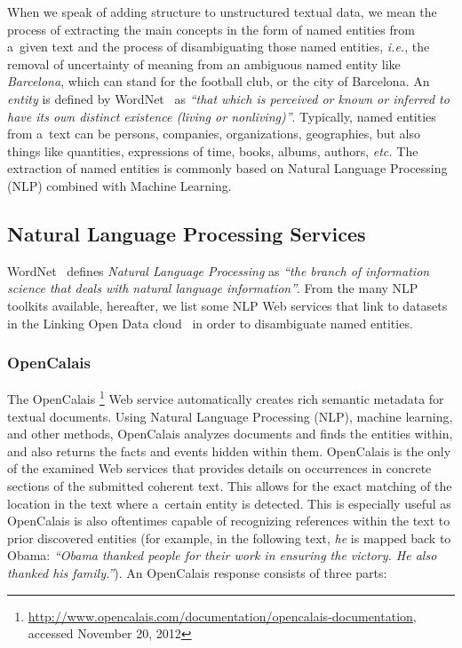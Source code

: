 When we speak of adding structure to unstructured textual data,
we mean the process of extracting the main concepts
in the form of named entities from a~given text
and the process of disambiguating those named entities,
\emph{i.e.}, the removal of uncertainty of meaning from
an ambiguous named entity like \emph{Barcelona},
which can stand for the football club, or the city of Barcelona.
An \emph{entity} is defined by
WordNet~\cite{miller1995wordnet,fellbaum1998wordnet}
as \textit{``that which is perceived or known or inferred
to have its own distinct existence (living or nonliving)''}. 
Typically, named entities from a~text can be persons, companies,
organizations, geographies, but also things like quantities,
expressions of time, books, albums, authors, \emph{etc.}
The extraction of named entities is commonly based on
Natural Language Processing (NLP) combined with Machine Learning.

\subsection{Natural Language Processing Services}
\label{sec:nlp-services}

WordNet~\cite{miller1995wordnet,fellbaum1998wordnet}
defines \emph{Natural Language Processing} as
\textit{``the branch of information science that deals with
natural language information''}.
From the many NLP toolkits available,
hereafter, we list some NLP Web services
that link to datasets in the
Linking Open Data
cloud~\cite{bizer2011statelodcloud,cyganiak2011lodcloud}
in order to disambiguate named entities.

\subsubsection{OpenCalais}\label{sec:opencalais}

The OpenCalais%
\footnote{\url{http://www.opencalais.com/documentation/opencalais-documentation},
accessed November 20, 2012}
Web service automatically creates rich semantic metadata
for textual documents.
Using Natural Language Processing (NLP),
machine learning, and other methods, OpenCalais analyzes documents
and finds the entities within, and also returns the facts and
events hidden within them.
OpenCalais is the only of the examined Web services
that provides details on occurrences in concrete sections
of the submitted coherent text.
This allows for the exact matching of the location in the text
where a~certain entity is detected.
This is especially useful as OpenCalais
is also oftentimes capable of recognizing references
within the text to prior discovered entities
(for example, in the following text,
\emph{he} is mapped back to Obama: \textit{``\emph{Obama}
thanked people for their work in ensuring the victory.
\emph{He} also thanked his family.''}).
An OpenCalais response consists of three parts:

